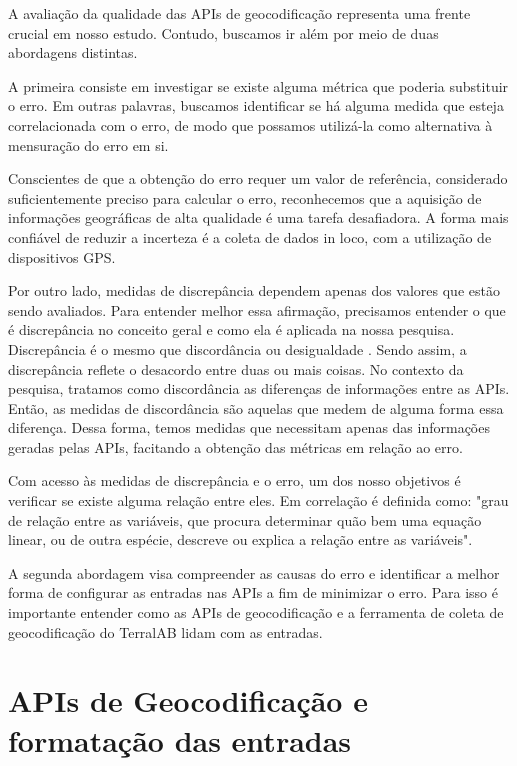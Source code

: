 A avaliação da qualidade das APIs de geocodificação representa uma frente crucial em nosso estudo. Contudo, buscamos ir além por meio de duas abordagens distintas.

A primeira consiste em investigar se existe alguma métrica que poderia substituir o erro. Em outras palavras, buscamos identificar se há alguma medida que esteja correlacionada com o erro, de modo que possamos utilizá-la como alternativa à mensuração do erro em si.


Conscientes de que a obtenção do erro requer um valor de referência, considerado suficientemente preciso para calcular o erro, reconhecemos que a aquisição de informações geográficas de alta qualidade é uma tarefa desafiadora. A forma mais confiável de reduzir a incerteza é a coleta de dados in loco, com a utilização de dispositivos GPS.

Por outro lado, medidas de discrepância dependem apenas dos valores que estão sendo avaliados. Para entender melhor essa afirmação, precisamos entender o que é discrepância no conceito geral e como ela é aplicada na nossa pesquisa. Discrepância é o mesmo que discordância ou desigualdade \cite{klein2015}. Sendo assim, a discrepância reflete o desacordo entre duas ou mais coisas. No contexto da pesquisa, tratamos como discordância as diferenças de informações entre as APIs. Então, as medidas de discordância são aquelas que medem de alguma forma essa diferença. Dessa forma, temos medidas que necessitam apenas das informações geradas pelas APIs, facitando a obtenção das métricas em relação ao erro.

Com acesso às medidas de discrepância e o erro, um dos nosso objetivos é verificar se existe alguma relação entre eles. Em \cite{spiegel2009} correlação é definida como: "grau de relação entre as variáveis, que procura determinar quão bem uma equação linear, ou de outra espécie, descreve ou explica a relação entre as variáveis". 


A segunda abordagem visa compreender as causas do erro e identificar a melhor forma de configurar as entradas nas APIs a fim de minimizar o erro. Para isso é importante entender como as APIs de geocodificação e a ferramenta de coleta de geocodificação do TerralAB \cite{terralab} lidam com as entradas. 

\section{APIs de Geocodificação e  formatação das entradas}

